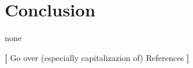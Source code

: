 \section{Conclusion}
\thispagestyle{plain}  %

none

\textsc{\LARGE \bf [} Go over (especially capitalizazion of) References \textsc{\LARGE \bf ]}